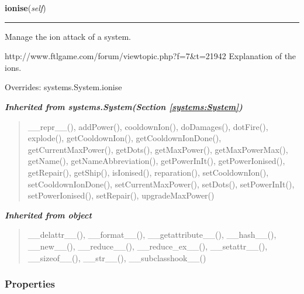    \vspace{0.5ex}

\hspace{.8\funcindent}\begin{boxedminipage}{\funcwidth}

    \raggedright \textbf{ionise}(\textit{self})

    \vspace{-1.5ex}

    \rule{\textwidth}{0.5\fboxrule}
\setlength{\parskip}{2ex}
    Manage the ion attack of a system.

    http://www.ftlgame.com/forum/viewtopic.php?f=7\&t=21942 Explanation of 
    the ions.

\setlength{\parskip}{1ex}
      Overrides: systems.System.ionise

    \end{boxedminipage}


\large{\textbf{\textit{Inherited from systems.System\textit{(Section \ref{systems:System})}}}}

\begin{quote}
\_\_repr\_\_(), addPower(), cooldownIon(), doDamages(), dotFire(), explode(), getCooldownIon(), getCooldownIonDone(), getCurrentMaxPower(), getDots(), getMaxPower(), getMaxPowerMax(), getName(), getNameAbbreviation(), getPowerInIt(), getPowerIonised(), getRepair(), getShip(), isIonised(), reparation(), setCooldownIon(), setCooldownIonDone(), setCurrentMaxPower(), setDots(), setPowerInIt(), setPowerIonised(), setRepair(), upgradeMaxPower()
\end{quote}

\large{\textbf{\textit{Inherited from object}}}

\begin{quote}
\_\_delattr\_\_(), \_\_format\_\_(), \_\_getattribute\_\_(), \_\_hash\_\_(), \_\_new\_\_(), \_\_reduce\_\_(), \_\_reduce\_ex\_\_(), \_\_setattr\_\_(), \_\_sizeof\_\_(), \_\_str\_\_(), \_\_subclasshook\_\_()
\end{quote}


  \subsubsection{Properties}

